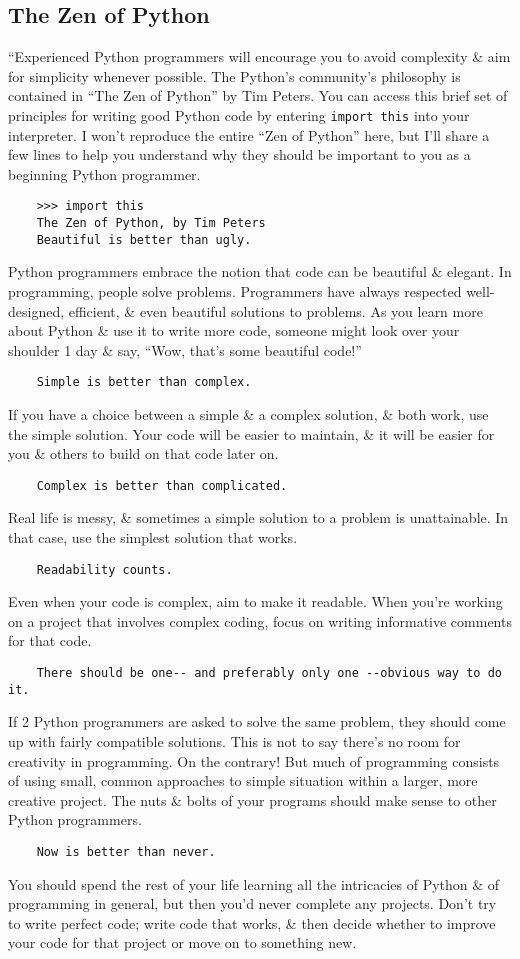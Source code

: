 \documentclass[oneside]{book}
\numberwithin{equation}{section}
\begin{document}
\subsection{The Zen of Python}
``Experienced Python programmers will encourage you to avoid complexity \& aim for simplicity whenever possible. The Python's community's philosophy is contained in ``The Zen of Python'' by Tim Peters. You can access this brief set of principles for writing good Python code by entering \texttt{import this} into your interpreter. I won't reproduce the entire ``Zen of Python'' here, but I'll share a few lines to help you understand why they should be important to you as a beginning Python programmer.
\begin{verbatim}
	>>> import this
	The Zen of Python, by Tim Peters
	Beautiful is better than ugly.
\end{verbatim}
Python programmers embrace the notion that code can be beautiful \& elegant. In programming, people solve problems. Programmers have always respected well-designed, efficient, \& even beautiful solutions to problems. As you learn more about Python \& use it to write more code, someone might look over your shoulder 1 day \& say, ``Wow, that's some beautiful code!''
\begin{verbatim}
	Simple is better than complex.
\end{verbatim}
If you have a choice between a simple \& a complex solution, \& both work, use the simple solution. Your code will be easier to maintain, \& it will be easier for you \& others to build on that code later on.
\begin{verbatim}
	Complex is better than complicated.
\end{verbatim}
Real life is messy, \& sometimes a simple solution to a problem is unattainable. In that case, use the simplest solution that works.
\begin{verbatim}
	Readability counts.
\end{verbatim}
Even when your code is complex, aim to make it readable. When you're working on a project that involves complex coding, focus on writing informative comments for that code.
\begin{verbatim}
	There should be one-- and preferably only one --obvious way to do it.
\end{verbatim}
If 2 Python programmers are asked to solve the same problem, they should come up with fairly compatible solutions. This is not to say there's no room for creativity in programming. On the contrary! But much of programming consists of using small, common approaches to simple situation within a larger, more creative project. The nuts \& bolts of your programs should make sense to other Python programmers.
\begin{verbatim}
	Now is better than never.
\end{verbatim}
You should spend the rest of your life learning all the intricacies of Python \& of programming in general, but then you'd never complete any projects. Don't try to write perfect code; write code that works, \& then decide whether to improve your code for that project or move on to something new.
\end{document}
